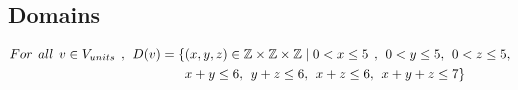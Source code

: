 \subsection{Domains}
\begin{align*}
For \hspace{1ex} all \hspace{1ex} v \in V_{units} \hspace{1ex},\hspace{1ex} D(v)=\{&(x,y,z) \in \mathbb{Z} \times \mathbb{Z}	\times \mathbb{Z} \mid  0<x \leq 5 \hspace{1ex} , \hspace{1ex} 0<y \leq 5,\hspace{1ex} 0<z \leq 5,\\& x+y\leq 6,\hspace{1ex} y+z\leq 6,\hspace{1ex}x+z\leq 6,\hspace{1ex}x+y+z\leq 7\}
\end{align*}
